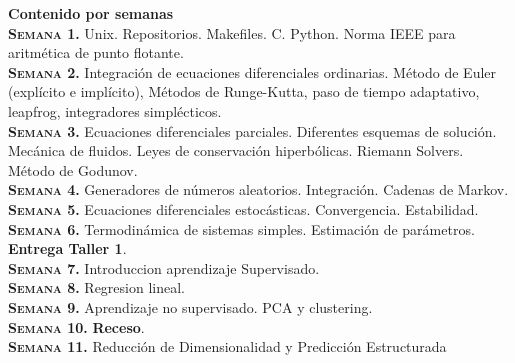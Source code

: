 \documentclass[letterpaper,10pt,onecolumn]{article}
\begin{document}
\noindent\textbf{\large {} \quad Contenido por
  semanas}\\[-0.2cm] 



\noindent\normalsize\textbf{\textsc{Semana 1.}}
Unix. Repositorios. Makefiles. C. Python. Norma IEEE para aritm\'etica de punto
flotante. 
\\[-0.3cm]

\noindent\textbf{\textsc{Semana 2.}} Integraci\'on de ecuaciones
diferenciales ordinarias. M\'etodo de Euler (expl\'icito e
impl\'icito), M\'etodos de Runge-Kutta, paso de tiempo adaptativo,
leapfrog, integradores simpl\'ecticos.
\\[-0.3cm]  

\noindent\textbf{\textsc{Semana 3.}} 
Ecuaciones diferenciales parciales. Diferentes esquemas de
soluci\'on. Mec\'anica de fluidos. Leyes de conservaci\'on
hiperb\'olicas. Riemann Solvers. M\'etodo de Godunov.
\\[-0.3cm]  

\noindent\textbf{\textsc{Semana 4.}} 
Generadores de n\'umeros aleatorios. Integraci\'on. Cadenas de Markov. 
\\[-0.3cm]  

\noindent\textbf{\textsc{Semana 5.}}
Ecuaciones diferenciales estoc\'asticas. Convergencia. Estabilidad.
\\[-0.3cm]

\noindent\textbf{\textsc{Semana 6.}} 
Termodin\'amica de sistemas simples. Estimaci\'on de par\'ametros. 
{\bf Entrega Taller 1}.
\\[-0.3cm]  

\noindent\textbf{\textsc{Semana 7.}} 
Introduccion aprendizaje Supervisado. 
\\[-0.3cm] 

\noindent\textbf{\textsc{Semana 8.}} 
Regresion lineal.
\\[-0.3cm]  

\noindent\textbf{\textsc{Semana 9.}} 
Aprendizaje no supervisado. PCA y  clustering.
\\[-0.3cm] 

\noindent\textbf{\textsc{Semana 10.}}  
{\bf Receso}.
\\[-0.3cm] 

\noindent\textbf{\textsc{Semana 11.}}  
Reducción de Dimensionalidad y Predicción Estructurada %
\\[-0.3cm] 
\end{document}
